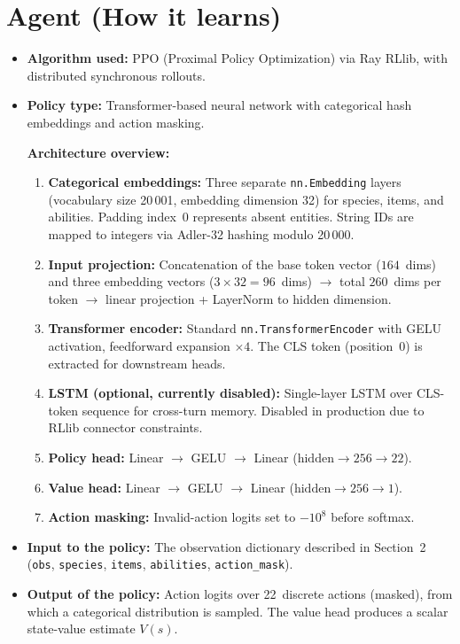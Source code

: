 \documentclass[11pt, a4paper]{article}
\begin{document}
\section{Agent (How it learns)}
\begin{itemize}
    \item \textbf{Algorithm used:}
        PPO (Proximal Policy Optimization) via Ray RLlib, with distributed synchronous rollouts.

    \item \textbf{Policy type:}
        Transformer-based neural network with categorical hash embeddings and action masking.

        \textbf{Architecture overview:}
        \begin{enumerate}
            \item \textbf{Categorical embeddings:} Three separate \texttt{nn.Embedding} layers (vocabulary size 20\,001, embedding dimension 32) for species, items, and abilities. Padding index~0 represents absent entities. String IDs are mapped to integers via Adler-32 hashing modulo 20\,000.
            \item \textbf{Input projection:} Concatenation of the base token vector ($164$~dims) and three embedding vectors ($3 \times 32 = 96$~dims) $\rightarrow$ total $260$~dims per token $\rightarrow$ linear projection + LayerNorm to hidden dimension.
            \item \textbf{Transformer encoder:} Standard \texttt{nn.TransformerEncoder} with GELU activation, feedforward expansion $\times4$. The CLS token (position~0) is extracted for downstream heads.
            \item \textbf{LSTM (optional, currently disabled):} Single-layer LSTM over CLS-token sequence for cross-turn memory. Disabled in production due to RLlib connector constraints.
            \item \textbf{Policy head:} Linear $\rightarrow$ GELU $\rightarrow$ Linear ($\text{hidden} \to 256 \to 22$).
            \item \textbf{Value head:} Linear $\rightarrow$ GELU $\rightarrow$ Linear ($\text{hidden} \to 256 \to 1$).
            \item \textbf{Action masking:} Invalid-action logits set to $-10^8$ before softmax.
        \end{enumerate}

    \item \textbf{Input to the policy:}
        The observation dictionary described in Section~2 (\texttt{obs}, \texttt{species}, \texttt{items}, \texttt{abilities}, \texttt{action\_mask}).

    \item \textbf{Output of the policy:}
        Action logits over 22~discrete actions (masked), from which a categorical distribution is sampled. The value head produces a scalar state-value estimate $V(s)$.
\end{itemize}
\end{document}
